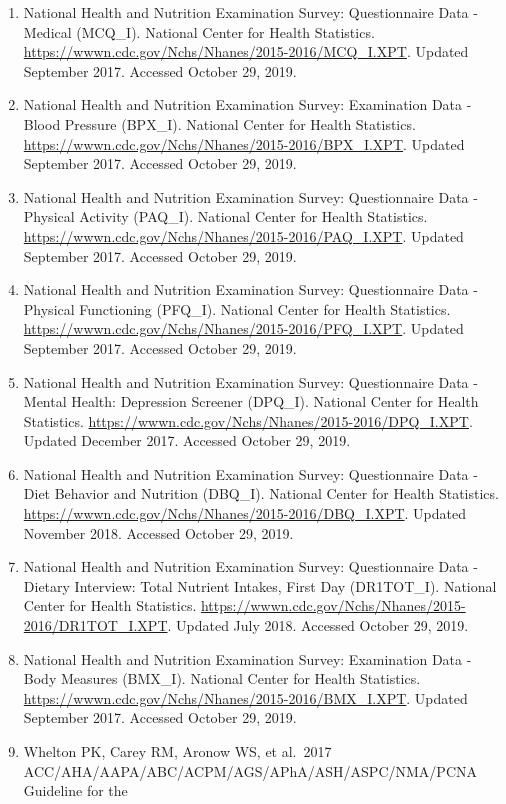\documentclass[]{article}
\begin{document}
\begin{enumerate}
\item
  National Health and Nutrition Examination Survey: Questionnaire Data -
  Medical (MCQ\_I). National Center for Health Statistics.
  \url{https://wwwn.cdc.gov/Nchs/Nhanes/2015-2016/MCQ_I.XPT}. Updated
  September 2017. Accessed October 29, 2019.
\item
  National Health and Nutrition Examination Survey: Examination Data -
  Blood Pressure (BPX\_I). National Center for Health Statistics.
  \url{https://wwwn.cdc.gov/Nchs/Nhanes/2015-2016/BPX_I.XPT}. Updated
  September 2017. Accessed October 29, 2019.
\item
  National Health and Nutrition Examination Survey: Questionnaire Data -
  Physical Activity (PAQ\_I). National Center for Health Statistics.
  \url{https://wwwn.cdc.gov/Nchs/Nhanes/2015-2016/PAQ_I.XPT}. Updated
  September 2017. Accessed October 29, 2019.
\item
  National Health and Nutrition Examination Survey: Questionnaire Data -
  Physical Functioning (PFQ\_I). National Center for Health Statistics.
  \url{https://wwwn.cdc.gov/Nchs/Nhanes/2015-2016/PFQ_I.XPT}. Updated
  September 2017. Accessed October 29, 2019.
\item
  National Health and Nutrition Examination Survey: Questionnaire Data -
  Mental Health: Depression Screener (DPQ\_I). National Center for
  Health Statistics.
  \url{https://wwwn.cdc.gov/Nchs/Nhanes/2015-2016/DPQ_I.XPT}. Updated
  December 2017. Accessed October 29, 2019.
\item
  National Health and Nutrition Examination Survey: Questionnaire Data -
  Diet Behavior and Nutrition (DBQ\_I). National Center for Health
  Statistics.
  \url{https://wwwn.cdc.gov/Nchs/Nhanes/2015-2016/DBQ_I.XPT}. Updated
  November 2018. Accessed October 29, 2019.
\item
  National Health and Nutrition Examination Survey: Questionnaire Data -
  Dietary Interview: Total Nutrient Intakes, First Day (DR1TOT\_I).
  National Center for Health Statistics.
  \url{https://wwwn.cdc.gov/Nchs/Nhanes/2015-2016/DR1TOT_I.XPT}. Updated
  July 2018. Accessed October 29, 2019.
\item
  National Health and Nutrition Examination Survey: Examination Data -
  Body Measures (BMX\_I). National Center for Health Statistics.
  \url{https://wwwn.cdc.gov/Nchs/Nhanes/2015-2016/BMX_I.XPT}. Updated
  September 2017. Accessed October 29, 2019.
\item
  Whelton PK, Carey RM, Aronow WS, et al.~2017
  ACC/AHA/AAPA/ABC/ACPM/AGS/APhA/ASH/ASPC/NMA/PCNA Guideline for the

\end{enumerate}
\end{document}
